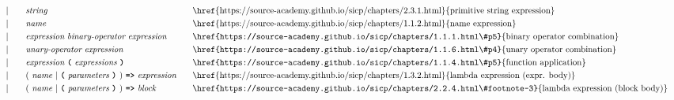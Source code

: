 \begin{alignat*}{9}
&&                       && |   &\quad &&  \textit{string}   && \textrm{\href{https://source-academy.github.io/sicp/chapters/2.3.1.html}{primitive string expression}}\\
&&                       && |   &\quad &&  \textit{name}   && \textrm{\href{https://source-academy.github.io/sicp/chapters/1.1.2.html}{name expression}}\\
&&                       && |   &\quad &&  \textit{expression} \  \textit{binary-operator} \ 
                                            \textit{expression} \qquad
                                                           && \textrm{\href{https://source-academy.github.io/sicp/chapters/1.1.1.html\#p5}{binary operator combination}}\\
&&                       && |   &\quad &&   \textit{unary-operator} \ 
                                            \textit{expression}
                                                           && \textrm{\href{https://source-academy.github.io/sicp/chapters/1.1.6.html\#p4}{unary operator combination}}\\
&&                       && |   &\quad &&   \textit{expression} \ 
                                            \textbf{\texttt{(}}\ \textit{expressions}\
                                            \textbf{\texttt{)}}
                                                           && \textrm{\href{https://source-academy.github.io/sicp/chapters/1.1.4.html\#p5}{function application}}\\
&&                       && |   &\quad &&   (\ \textit{name}\ | \
                                               \textbf{\texttt{(}}\ \textit{parameters}\ \textbf{\texttt{)}}\
                                            )\    
                                            \texttt{\textbf{=>}}\ \textit{expression}
                                                           && \textrm{\href{https://source-academy.github.io/sicp/chapters/1.3.2.html}{lambda expression (expr. body)}}\\
&&                       && |   &\quad &&   (\ \textit{name}\ | \
                                               \textbf{\texttt{(}}\ \textit{parameters}\ \textbf{\texttt{)}}\
                                            )\    
                                            \texttt{\textbf{=>}}\ \textit{block}
                                                           && \textrm{\href{https://source-academy.github.io/sicp/chapters/2.2.4.html\#footnote-3}{lambda expression (block body)}}\\

\end{alignat*}
